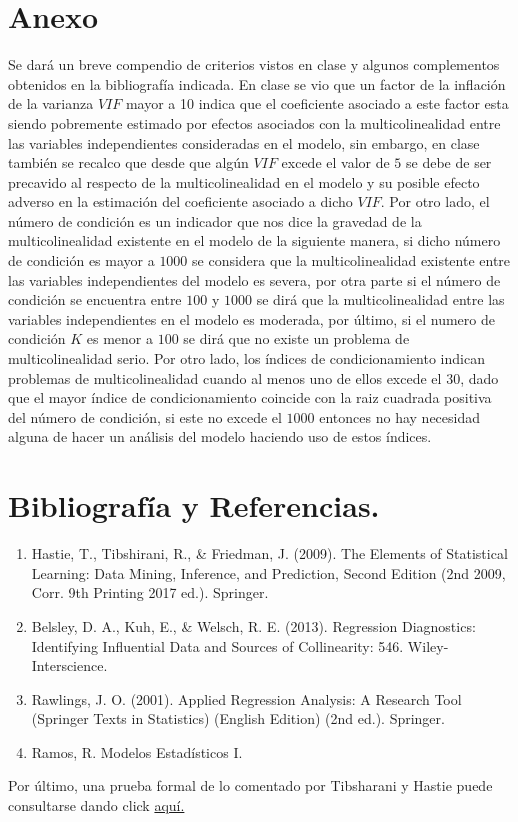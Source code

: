 \documentclass[10.5pt,notitlepage]{article}
\theoremstyle{plain}
\begin{document}
\section{Anexo}
Se dará un breve compendio de criterios vistos en clase y algunos complementos obtenidos en la bibliografía indicada. En clase se vio que un factor de la inflación de la varianza \(VIF\) mayor a 10 indica que el coeficiente asociado a este factor esta siendo pobremente estimado por efectos asociados con la multicolinealidad entre las variables independientes consideradas en el modelo, sin embargo, en clase también se recalco que desde que algún \(VIF\) excede el valor de \(5\) se debe de ser precavido al respecto de la multicolinealidad en el modelo y su posible efecto adverso en la estimación del coeficiente asociado a dicho \(VIF\). Por otro lado, el número de condición es un indicador que nos dice la gravedad de la multicolinealidad existente en el modelo de la siguiente manera, si dicho número de condición es mayor a \(1000\) se considera que la multicolinealidad existente entre las variables independientes del modelo es severa, por otra parte si el número de condición se encuentra entre \(100\) y \(1000\) se dirá que la multicolinealidad entre las variables independientes en el modelo es moderada, por último, si el numero de condición \(K\) es menor a \(100\) se dirá que no existe un problema de multicolinealidad serio. Por otro lado, los índices de condicionamiento indican problemas de multicolinealidad cuando al menos uno de ellos excede el \(30\), dado que el mayor índice de condicionamiento coincide con la raiz cuadrada positiva del número de condición, si este no excede el \(1000\) entonces no hay necesidad alguna de hacer un análisis del modelo haciendo uso de estos índices. 

\section{Bibliografía y Referencias.}
\begin{enumerate}
    \item Hastie, T., Tibshirani, R., & Friedman, J. (2009). The Elements of Statistical Learning: Data Mining, Inference, and Prediction, Second Edition (2nd 2009, Corr. 9th Printing 2017 ed.). Springer.
    \item Belsley, D. A., Kuh, E., & Welsch, R. E. (2013). Regression Diagnostics: Identifying Influential Data and Sources of Collinearity: 546. Wiley-Interscience.
    \item Rawlings, J. O. (2001). Applied Regression Analysis: A Research Tool (Springer Texts in Statistics) (English Edition) (2nd ed.). Springer.
    \item Ramos, R. Modelos Estadísticos I.
\end{enumerate}
Por último, una prueba formal de lo comentado por Tibsharani y Hastie puede consultarse dando click 
\href{https://stats.stackexchange.com/questions/322101/does-l2-normalization-of-ridge-regression-punish-intercept-if-not-how-to-solve}{aquí.}
\end{document}
